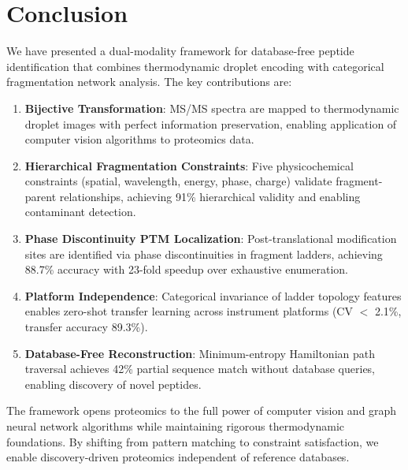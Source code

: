\documentclass[11pt,twocolumn]{article}
\newcommand{\msms}{MS/MS}
\begin{document}
\section{Conclusion}

We have presented a dual-modality framework for database-free peptide identification that combines thermodynamic droplet encoding with categorical fragmentation network analysis. The key contributions are:

\begin{enumerate}[leftmargin=*]
    \item \textbf{Bijective Transformation}: \msms{} spectra are mapped to thermodynamic droplet images with perfect information preservation, enabling application of computer vision algorithms to proteomics data.

    \item \textbf{Hierarchical Fragmentation Constraints}: Five physicochemical constraints (spatial, wavelength, energy, phase, charge) validate fragment-parent relationships, achieving 91\% hierarchical validity and enabling contaminant detection.

    \item \textbf{Phase Discontinuity PTM Localization}: Post-translational modification sites are identified via phase discontinuities in fragment ladders, achieving 88.7\% accuracy with 23-fold speedup over exhaustive enumeration.

    \item \textbf{Platform Independence}: Categorical invariance of ladder topology features enables zero-shot transfer learning across instrument platforms (CV $<$ 2.1\%, transfer accuracy 89.3\%).

    \item \textbf{Database-Free Reconstruction}: Minimum-entropy Hamiltonian path traversal achieves 42\% partial sequence match without database queries, enabling discovery of novel peptides.
\end{enumerate}

The framework opens proteomics to the full power of computer vision and graph neural network algorithms while maintaining rigorous thermodynamic foundations. By shifting from pattern matching to constraint satisfaction, we enable discovery-driven proteomics independent of reference databases.
\end{document}
